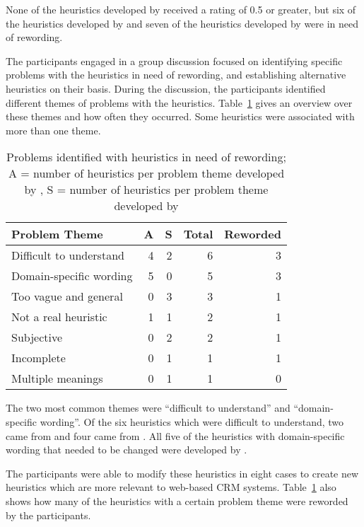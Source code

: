 None of the heuristics developed by \citet{Nielsen1994a} received a rating of 0.5 or greater, but six of the heuristics developed by \citet{Singh2009} and seven of the heuristics developed by \citet{Ardito2006} were in need of rewording.

The participants engaged in a group discussion focused on identifying specific problems with the heuristics in need of rewording, and establishing alternative heuristics on their basis. During the discussion, the participants identified different themes of problems with the heuristics. Table~\ref{tab:first_results_rewording_themes} gives an overview over these themes and how often they occurred. Some heuristics were associated with more than one theme.

\begin{table}[htbp]
	\centering
	\vspace{0.5cm}
	\caption[Problems identified with heuristics in need of rewording]{Problems identified with heuristics in need of rewording; A = number of heuristics per problem theme developed by \citet{Ardito2006}, S = number of heuristics per problem theme developed by \citet{Singh2009}}
	\label{tab:first_results_rewording_themes}
	\begin{tabular}{lrrrr}	\toprule
		\textbf{Problem Theme} 	& \textbf{A} & \textbf{S} & \textbf{Total} & \textbf{Reworded} \\ \midrule
		Difficult to understand & 4 & 2 & 6 & 3 \\
		Domain-specific wording & 5 & 0 & 5 & 3 \\
		Too vague and general 	& 0 & 3 & 3 & 1 \\
		Not a real heuristic	& 1 & 1 & 2 & 1 \\
		Subjective				& 0 & 2 & 2 & 1 \\
		Incomplete				& 0 & 1 & 1 & 1 \\
		Multiple meanings		& 0 & 1 & 1 & 0 \\
		\bottomrule
	\end{tabular}
\end{table}

The two most common themes were ``difficult to understand'' and ``domain-specific wording''. Of the six heuristics which were difficult to understand, two came from \citet{Singh2009} and four came from \citet{Ardito2006}. All five of the heuristics with domain-specific wording that needed to be changed were developed by \citet{Ardito2006}.

The participants were able to modify these heuristics in eight cases to create new heuristics which are more relevant to web-based CRM systems. Table~\ref{tab:first_results_rewording_themes} also shows how many of the heuristics with a certain problem theme were reworded by the participants.

